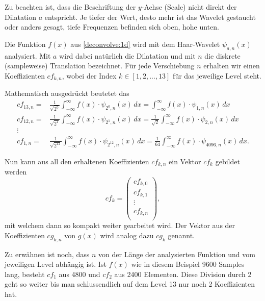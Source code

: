 Zu beachten ist, dass die Beschriftung der $y$-Achse (Scale) nicht direkt der Dilatation $a$ entspricht.
Je tiefer der Wert, desto mehr ist das Wavelet gestaucht oder anders gesagt, tiefe Frequenzen befinden sich oben, hohe unten.

Die Funktion $f(x)$ aus \ref{deconvolve:1d} wird mit dem Haar-Wavelet $\psi_{a,n}(x)$ analysiert.
Mit $a$ wird dabei natürlich die Dilatation und mit $n$ die diskrete (sampleweise) Translation bezeichnet.
Für jede Verschiebung $n$ erhalten wir einen Koeffizienten $cf_{k,n}$, wobei der Index $k\in[1,2,...,13]$ für das jeweilige Level steht. 

Mathematisch ausgedrückt beutetet das
\begin{align*}
	cf_{13,n} =& \frac{1}{\sqrt{2^0}}\int_{-\infty}^{\infty}f(x)\cdot\psi_{2^0, n}(x)\,dx = \int_{-\infty}^{\infty}f(x)\cdot\psi_{1, n}(x)\,dx\\
	cf_{12,n} =& \frac{1}{\sqrt{2^1}}\int_{-\infty}^{\infty}f(x)\cdot\psi_{2^1, n}(x)\,dx = \frac{1}{\sqrt{2}}\int_{-\infty}^{\infty}f(x)\cdot\psi_{2, n}(x)\,dx\\
	\vdots\\
	cf_{1,n} =& \frac{1}{\sqrt{2^{12}}}\int_{-\infty}^{\infty}f(x)\cdot\psi_{2^{12}, n}(x)\,dx = \frac{1}{64}\int_{-\infty}^{\infty}f(x)\cdot\psi_{4096, n}(x)\,dx.
\end{align*}

Nun kann aus all den erhaltenen Koeffizienten $cf_{k,n}$ ein Vektor $cf_k$ gebildet werden
$$cf_k = \left(\begin{array}{c}
	cf_{k,0}\\
	cf_{k,1}\\
	\vdots\\
	cf_{k,n}\\
\end{array}\right),$$
mit welchem dann so kompakt weiter gearbeitet wird.
Der Vektor aus der Koeffizienten $cg_{k,n}$ von $g(x)$ wird analog dazu $cg_k$ genannt.

Zu erwähnen ist noch, dass $n$ von der Länge der analysierten Funktion und vom jeweiligen Level abhängig ist.
Ist $f(x)$ wie in diesem Beispiel 9600 Samples lang, besteht $cf_1$ aus 4800 und $cf_2$ aus 2400 Elementen.
Diese Division durch 2 geht so weiter bis man schlussendlich auf dem Level 13 nur noch 2 Koeffizienten hat.

